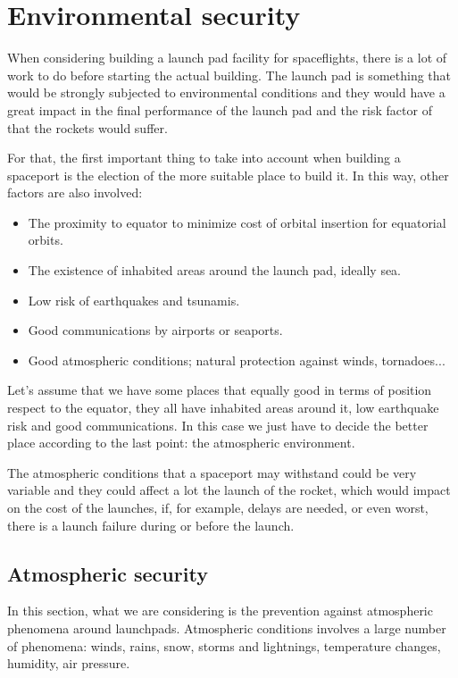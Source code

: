 \section{Environmental security}

When considering building a launch pad facility for spaceflights, there is a lot
of work to do before starting the actual building. The launch pad is something
that would be strongly subjected to environmental conditions and they would have a
great impact in the final performance of the launch pad and the risk factor of
that the rockets would suffer.

For that, the first important thing to take into account when building a
spaceport is the election of the more suitable place to build it. In this way,
other factors are also involved:

\begin{itemize}
	\item The proximity to equator to minimize cost of orbital insertion for equatorial orbits.
	\item The existence of inhabited areas around the launch pad, ideally sea.
	\item Low risk of earthquakes and tsunamis.
	\item Good communications by airports or seaports.
	\item Good atmospheric conditions; natural protection against winds, tornadoes...
\end{itemize}

Let's assume that we have some places that equally good in terms of position respect
to the equator, they all have inhabited areas around it, low earthquake risk and
good communications. In this case we just have to decide the better place according
to the last point: the atmospheric environment.

The atmospheric conditions that a spaceport may withstand could be very variable
and they could affect a lot the launch of the rocket, which would impact on the
cost of the launches, if, for example, delays are needed, or even worst, there
is a launch failure during or before the launch.

\subsection{Atmospheric security}

In this section, what we are considering is the prevention against atmospheric
phenomena around launchpads. Atmospheric conditions involves a large number of
phenomena: winds, rains, snow, storms and lightnings, temperature changes, humidity, air pressure.

